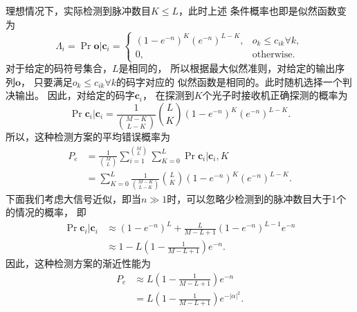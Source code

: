 理想情况下，实际检测到脉冲数目$K \le L$，此时上述
条件概率也即是似然函数变为
\begin{equation}
\Lambda_i = \Pr{\bm{o} | \bm{c}_i} = \begin{cases} 
                                        \left(1 - e^{-n} \right)^{K} \left(e^{-n} \right)^{L-K}, & o_k \le c_{ik} \forall k,\\
                                        0,                                                       & \text{otherwise}.
                                    \end{cases}
\end{equation}
对于给定的码符号集合，$L$是相同的，
所以根据最大似然准则，对给定的输出序列$\bm{o}$，
只要满足$o_k \le c_{ik} \forall k$的码字对应的
似然函数是相同的。此时随机选择一个判决输出。
因此，对给定的码字$\bm{c}_i$，
在探测到$K$个光子时接收机正确探测的概率为
\begin{equation}
\Pr{\bm{c}_i | \bm{c}_i} = \frac{1}{\binom{M-K}{L-K}} \binom{L}{K} \left(1 - e^{-n} \right)^{K} \left(e^{-n} \right)^{L-K}.
\end{equation}
所以，这种检测方案的平均错误概率为
\begin{equation}
\begin{split}
P_e &= \frac{1}{\binom{M}{L}}\sum_{i=1}^{\binom{M}{L}} \sum_{K=0}^{L} \Pr{\bm{c}_i | \bm{c}_i, K}  \\
    &= \sum_{K=0}^{L} \frac{1}{\binom{M-K}{L-K}} \binom{L}{K} \left(1 - e^{-n} \right)^{K} \left(e^{-n} \right)^{L-K}.
\end{split}
\end{equation}
下面我们考虑大信号近似，即当$n \gg 1$时，可以忽略少检测到的脉冲数目大于1个的情况的概率，
即
\begin{equation}
\begin{split}
\Pr{\bm{c}_i | \bm{c}_i} &\approx (1-e^{-n})^L + \frac{L}{M-L+1} (1-e^{-n})^{L-1} e^{-n} \\
                            &\approx 1 - L\left(1 - \frac{1}{M-L+1} \right)e^{-n}.
\end{split}
\end{equation}
因此，这种检测方案的渐近性能为
\begin{equation}
\begin{split}
P_e & \approx L\left(1 - \frac{1}{M-L+1} \right)e^{-n} \\
    & = L\left(1 - \frac{1}{M-L+1} \right)e^{-|\alpha|^2}.
\end{split}
\end{equation}



